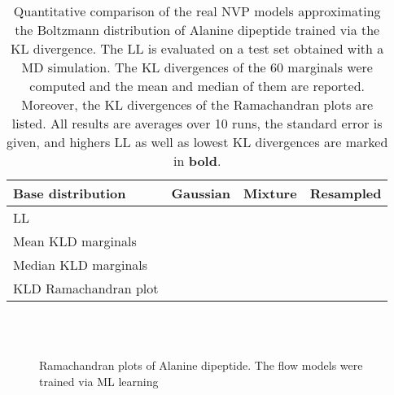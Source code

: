 \documentclass[twoside]{article}
\begin{document}
\begin{table}[h]
  \caption{Quantitative comparison of the real NVP models approximating the Boltzmann distribution of Alanine dipeptide trained via the KL divergence. The LL is evaluated on a test set obtained with a MD simulation. The KL divergences of the 60 marginals were computed and the mean and median of them are reported. Moreover, the KL divergences of the Ramachandran plots are listed. All results are averages over 10 runs, the standard error is given, and highers LL as well as lowest KL divergences are marked in \textbf{bold}.}
  \label{tab:aldp_kld_rnvp_rkld}
  \centering
  \vspace{0.3cm}
  \begin{tabular}{l|lll}
    Base distribution & Gaussian & Mixture & Resampled \\
    \hline
    LL  &  &  &  \\
    Mean KLD marginals  &  &  &  \\
    Median KLD marginals  &  &  &  \\
    KLD Ramachandran plot &  &  & 
  \end{tabular}
\end{table}

\begin{figure}[h]
	\centering
	\hfil
	\\
	\hfil
	\\
	\caption{Ramachandran plots of Alanine dipeptide. The flow models were trained via ML learning}
	\label{fig:ramachandran_rnvp_fkld}
\end{figure}
\end{document}
